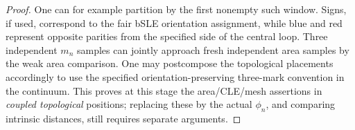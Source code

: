 \begin{proof}
One can for example partition by the first nonempty such window.
Signs, if used, correspond to the fair bSLE orientation assignment, while blue and red represent opposite parities from the specified side of the central loop.
Three independent \(m_n\) samples can jointly approach fresh independent area samples by the weak area comparison.
One may postcompose the topological placements accordingly to use the specified orientation-preserving three-mark convention in the continuum.
This proves at this stage the area/CLE/mesh assertions in \emph{coupled topological} positions; replacing these by the actual \(\phi_n\), and comparing intrinsic distances, still requires separate arguments.

\end{proof}
